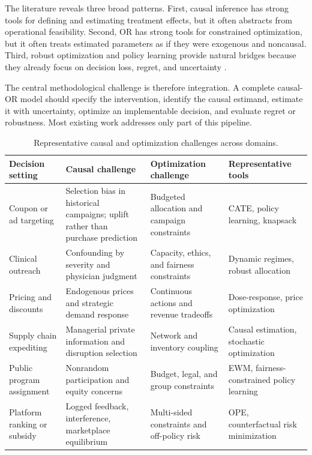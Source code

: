 \documentclass[11pt]{article}
\begin{document}
The literature reveals three broad patterns. First, causal inference has strong tools for defining and estimating treatment effects, but it often abstracts from operational feasibility. Second, OR has strong tools for constrained optimization, but it often treats estimated parameters as if they were exogenous and noncausal. Third, robust optimization and policy learning provide natural bridges because they already focus on decision loss, regret, and uncertainty \citep{kitagawa2018treated,ben2009robust,kallus2018confounding,athey2021policy}.

The central methodological challenge is therefore integration. A complete causal-OR model should specify the intervention, identify the causal estimand, estimate it with uncertainty, optimize an implementable decision, and evaluate regret or robustness. Most existing work addresses only part of this pipeline.

\begin{table}[htbp]
\centering
\small
\begin{tabular}{p{} p{} p{} p{}}
\toprule
\textbf{Decision setting} & \textbf{Causal challenge} & \textbf{Optimization challenge} & \textbf{Representative tools} \\
\midrule
Coupon or ad targeting & Selection bias in historical campaigns; uplift rather than purchase prediction & Budgeted allocation and campaign constraints & CATE, policy learning, knapsack \\
Clinical outreach & Confounding by severity and physician judgment & Capacity, ethics, and fairness constraints & Dynamic regimes, robust allocation \\
Pricing and discounts & Endogenous prices and strategic demand response & Continuous actions and revenue tradeoffs & Dose-response, price optimization \\
Supply chain expediting & Managerial private information and disruption selection & Network and inventory coupling & Causal estimation, stochastic optimization \\
Public program assignment & Nonrandom participation and equity concerns & Budget, legal, and group constraints & EWM, fairness-constrained policy learning \\
Platform ranking or subsidy & Logged feedback, interference, marketplace equilibrium & Multi-sided constraints and off-policy risk & OPE, counterfactual risk minimization \\
\bottomrule
\end{tabular}
\caption{Representative causal and optimization challenges across domains.}
\end{table}
\end{document}

